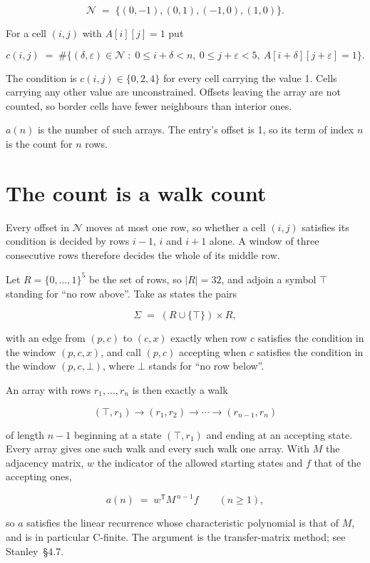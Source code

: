 \documentclass[11pt]{article}
\theoremstyle{definition}
\begin{document}
\[\mathcal{N} \;=\; \{(0,-1), (0,1), (-1,0), (1,0)\}.\]

For a cell $(i,j)$ with $A[i][j] = 1$ put

\[c(i,j) \;=\; \#\bigl\{(\delta,\varepsilon)\in\mathcal{N} \;:\; 0\le i+\delta<n,\ 0\le j+\varepsilon<5,\ A[i+\delta][j+\varepsilon] = 1\bigr\}.\]

The condition is $c(i,j) \in \{0, 2, 4\}$ for every cell carrying the value 1. Cells carrying any other value are unconstrained. Offsets leaving the array are not counted, so border cells have fewer neighbours than interior ones.

$a(n)$ is the number of such arrays. The entry's offset is 1, so its term of index $n$ is the count for $n$ rows.

\section{The count is a walk count}

Every offset in $\mathcal{N}$ moves at most one row, so whether a cell $(i,j)$ satisfies its condition is decided by rows $i-1$, $i$ and $i+1$ alone. A window of three consecutive rows therefore decides the whole of its middle row.

Let $R = \{0,\dots,1\}^{5}$ be the set of rows, so $|R| = 32$, and adjoin a symbol $\top$ standing for ``no row above''. Take as states the pairs

\[\Sigma \;=\; (R \cup \{\top\}) \times R,\]

with an edge from $(p,c)$ to $(c,x)$ exactly when row $c$ satisfies the condition in the window $(p,c,x)$, and call $(p,c)$ accepting when $c$ satisfies the condition in the window $(p,c,\bot)$, where $\bot$ stands for ``no row below''.

An array with rows $r_1,\dots,r_n$ is then exactly a walk

\[(\top,r_1) \to (r_1,r_2) \to \cdots \to (r_{n-1},r_n)\]

of length $n-1$ beginning at a state $(\top,r_1)$ and ending at an accepting state. Every array gives one such walk and every such walk one array. With $M$ the adjacency matrix, $w$ the indicator of the allowed starting states and $f$ that of the accepting ones,

\[a(n) \;=\; w^{\mathsf T} M^{\,n-1} f \qquad (n \ge 1),\]

so $a$ satisfies the linear recurrence whose characteristic polynomial is that of $M$, and is in particular C-finite. The argument is the transfer-matrix method; see Stanley~\S4.7.
\end{document}
